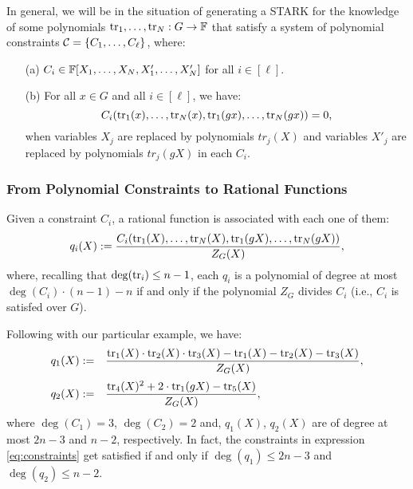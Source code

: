In general, we will be in the situation of generating a STARK for the knowledge of some polynomials $\text{tr}_1, \dots, \text{tr}_N: G \to \mathbb{F}$ that satisfy a system of polynomial constraints $\mathcal{C} = \{C_1, \dots, C_\ell \}$, where:
\begin{enumerate}
  \item[(a)] $C_i \in \mathbb{F}[X_1, \dots, X_N, X'_1, \dots, X'_N]$ for all $i \in [\ell]$.
  \item[(b)] For all $x \in G$ and all $i \in [\ell]$, we have:
  \begin{equation}\label{eq:generic-constraints}
  C_i(\text{tr}_1(x), \dots, \text{tr}_N(x), \text{tr}_1(gx), \dots, \text{tr}_N(gx)) = 0,
  \end{equation}
  when variables $X_j$ are replaced by polynomials $tr_j(X)$ and variables $X'_j$ are replaced by polynomials $tr_j(gX)$ in each $C_i$.
\end{enumerate}


\subsubsection*{From Polynomial Constraints to Rational Functions}\label{sec:constraint-rational}

Given a constraint $C_i$, a rational function is associated with each one of them:
\begin{equation}\label{eq:rational-function}
q_i(X) := \frac{C_i(\text{tr}_1(X), \dots, \text{tr}_N(X), \text{tr}_1(gX), \dots, \text{tr}_N(gX))}{Z_G(X)},
\end{equation}
where, recalling that $\deg(\text{tr}_i) \leq n-1$, each $q_i$ is a polynomial of degree at most $\deg(C_i) \cdot (n - 1) - n$ if and only if the polynomial $Z_G$ divides $C_i$ (i.e., $C_i$ is satisfed over $G$).

Following with our particular example, we have:
\begin{align*}
\begin{array}{rl}
q_1(X) := &\displaystyle \frac{\text{tr}_1(X) \cdot \text{tr}_2(X) \cdot \text{tr}_3(X) - \text{tr}_1(X) - \text{tr}_2(X) - \text{tr}_3(X)}{Z_{G}(X)}, \\[0.4cm]
q_2(X) := &\displaystyle \frac{\text{tr}_4(X)^2 + 2 \cdot \text{tr}_1(gX) - \text{tr}_5(X)}{Z_G(X)},
\end{array}
\end{align*}
where $\deg(C_1)=3$, $\deg(C_2)=2$ and, $q_1(X)$, $q_2(X)$ are of degree at most $2n-3$ and $n-2$, respectively.
In fact, the constraints in expression \eqref{eq:constraints} get satisfied if and only if $\deg(q_1) \leq 2n - 3$ and $\deg(q_2) \leq n - 2$. 



